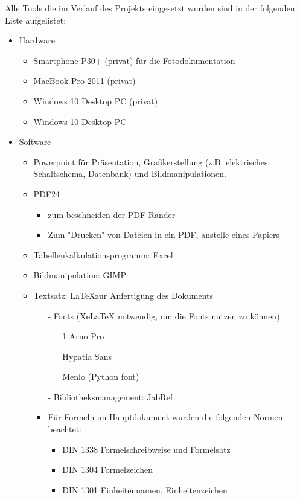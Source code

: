 
 Alle Tools die im Verlauf des Projekts eingesetzt wurden sind in der folgenden Liste aufgelistet:


\begin{itemize}
\item Hardware
	\begin{itemize}
	\item Smartphone P30+ (privat) für die Fotodokumentation
	\item MacBook Pro 2011 (privat)
	\item Windows 10 Desktop PC (privat)
	\item Windows 10 Desktop PC
	\end{itemize}

\item Software
	\begin{itemize}
	\item Powerpoint für Präsentation, Grafikerstellung (z.B. elektrisches Schaltschema, Datenbank) und Bildmanipulationen.
	\item PDF24 
		\begin{itemize}	
		\item zum beschneiden der PDF Ränder
		\item Zum "Drucken" von Dateien in ein PDF, anstelle eines Papiers
		\end{itemize}
	\item Tabellenkalkulationsprogramm: Excel
	\item Bildmanipulation: GIMP 
	\item Textsatz: \LaTeX zur Anfertigung des Dokuments
		\begin{itemize}
		\item[-] Fonts (XeLaTeX notwendig, um die Fonts nutzen zu können)
			\begin{itemize}			
			\item[1] Arno Pro
			\item[{\Hypatia 2}] {\Hypatia Hypatia Sans}
			\item[{\Menlo 3}] {\Menlo Menlo (Python font)}
			\end{itemize}
		\item[-] Bibliotheksmanagement: JabRef 
		\item Für Formeln im Hauptdokument wurden die folgenden Normen beachtet:
		\begin{itemize}
		\item DIN 1338 Formelschreibweise und Formelsatz
		\item DIN 1304 Formelzeichen
		\item DIN 1301 Einheitennamen, Einheitenzeichen

\end{itemize}
\end{itemize}
\end{itemize}
\end{itemize}
